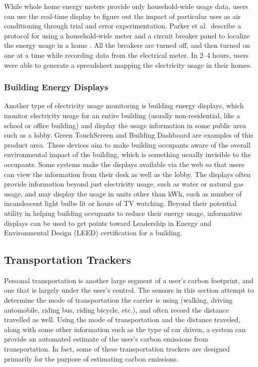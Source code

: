 While whole home energy meters provide only household-wide usage data, users can use the real-time display to figure out the impact of particular uses as air conditioning through trial and error experimentation. Parker et al.\ describe a protocol for using a household-wide meter and a circuit breaker panel to localize the energy usage in a home \cite{Parker2006How-Much-Energy}. All the breakers are turned off, and then turned on one at a time while recording data from the electrical meter. In 2--4 hours, users were able to generate a spreadsheet mapping the electricity usage in their homes.

\subsubsection{Building Energy Displays}
\label{sec:building-energy-displays}

Another type of electricity usage monitoring is building energy displays, which monitor electricity usage for an entire building (usually non-residential, like a school or office building) and display the usage information in some public area such as a lobby. Green TouchScreen \cite{greentouchscreen} and Building Dashboard \cite{building-dashboard} are examples of this product area. These devices aim to make building occupants aware of the overall environmental impact of the building, which is something usually invisible to the occupants. Some systems make the displays available via the web so that users can view the information from their desk as well as the lobby. The displays often provide  information beyond just electricity usage, such as water or natural gas usage, and may display the usage in units other than kWh, such as number of incandescent light bulbs lit or hours of TV watching. Beyond their potential utility in helping building occupants to reduce their energy usage, informative displays can be used to get points toward Leadership in Energy and Environmental Design (LEED) certification for a building.

\subsection{Transportation Trackers}

Personal transportation is another large segment of a user's carbon footprint, and one that is largely under the user's control. The sensors in this section attempt to determine the mode of transportation the carrier is using (walking, driving automobile, riding bus, riding bicycle, etc.), and often record the distance travelled as well. Using the mode of transportation and the distance traveled, along with some other information such as the type of car driven, a system can provide an automated estimate of the user's carbon emissions from transportation. In fact, some of these transportation trackers are designed primarily for the purpose of estimating carbon emissions.

